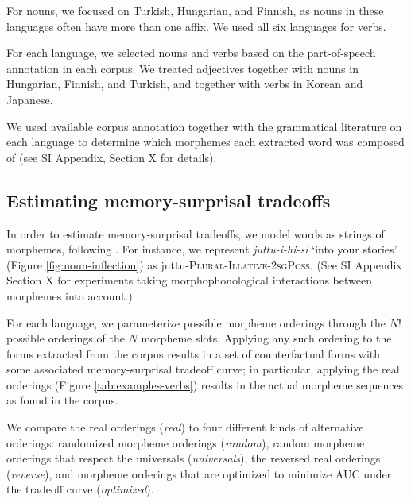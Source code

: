 \documentclass[11pt,letterpaper]{article}
\newcommand{\citet}{\Textcite}
\newcommand{\jd}[1]{\textcolor{Pink}{[jd: #1]}}
\begin{document}




For nouns, we focused on Turkish, Hungarian, and Finnish, as nouns in these languages often have more than one affix.
We used all six languages for verbs.

For each language, we selected nouns and verbs based on the part-of-speech annotation in each corpus.
We treated adjectives together with nouns in Hungarian, Finnish, and Turkish, and together with verbs in Korean and Japanese.

We used available corpus annotation together with the grammatical literature on each language to determine which morphemes each extracted word was composed of (see SI Appendix, Section X for details).



\subsection{Estimating memory-surprisal tradeoffs}

In order to estimate memory-surprisal tradeoffs, we model words as strings of morphemes, following \citet{Hahn2020modeling}.
For instance, we represent \textit{juttu-i-hi-si} `into your stories' (Figure \ref{fig:noun-inflection}) as juttu-\textsc{Plural}-\textsc{Illative}-\textsc{2sgPoss}.
(See SI Appendix Section X for experiments taking morphophonological interactions between morphemes into account.)

For each language, we parameterize possible morpheme orderings through the $N!$ possible orderings of the $N$ morpheme slots.
Applying any such ordering to the forms extracted from the corpus results in a set of counterfactual forms with some associated memory-surprisal tradeoff curve; in particular, applying the real orderings (Figure \ref{tab:examples-verbs}) results in the actual morpheme sequences as found in the corpus.

We compare the real orderings (\textit{real}) to four different kinds of alternative orderings: randomized morpheme orderings (\textit{random}), random morpheme orderings that respect the universals (\textit{universals}), the reversed real orderings (\textit{reverse}), and morpheme orderings that are optimized to minimize AUC under the tradeoff curve (\textit{optimized}). 
\end{document}
